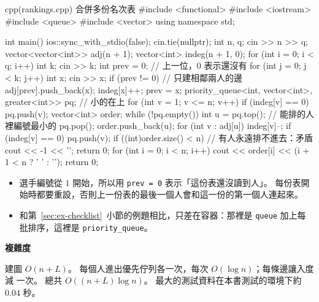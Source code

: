 \begin{example}[label=ex:rankings]{cpp}{(rankings.cpp) 合併多份名次表}
#include <functional>
#include <iostream>
#include <queue>
#include <vector>
using namespace std;

int main() {
    ios::sync_with_stdio(false);
    cin.tie(nullptr);
    int n, q;
    cin >> n >> q;
    vector<vector<int>> adj(n + 1);
    vector<int> indeg(n + 1, 0);
    for (int i = 0; i < q; i++) {
        int k;
        cin >> k;
        int prev = 0;                       // 上一位，0 表示還沒有
        for (int j = 0; j < k; j++) {
            int x;
            cin >> x;
            if (prev != 0) {                // 只建相鄰兩人的邊
                adj[prev].push_back(x);
                indeg[x]++;
            }
            prev = x;
        }
    }
    priority_queue<int, vector<int>, greater<int>> pq;   // 小的在上
    for (int v = 1; v <= n; v++) {
        if (indeg[v] == 0) {
            pq.push(v);
        }
    }
    vector<int> order;
    while (!pq.empty()) {
        int u = pq.top();                   // 能排的人裡編號最小的
        pq.pop();
        order.push_back(u);
        for (int v : adj[u]) {
            indeg[v]--;
            if (indeg[v] == 0) {
                pq.push(v);
            }
        }
    }
    if ((int)order.size() < n) {            // 有人永遠排不進去：矛盾
        cout << -1 << '\n';
        return 0;
    }
    for (int i = 0; i < n; i++) {
        cout << order[i] << (i + 1 < n ? ' ' : '\n');
    }
    return 0;
}
\end{example}


\begin{itemize}
\item 選手編號從 $1$ 開始，所以用 \texttt{prev = 0} 表示「這份表還沒讀到人」。
每份表開始時都要重設，否則上一份表的最後一個人會和這一份的第一個人連起來。
\item 和第~\ref{sec:ex-checklist}~小節的例題相比，只差在容器：那裡是
\texttt{queue} 加上每批排序，這裡是 \texttt{priority\_queue}。
\end{itemize}

\textbf{複雜度}

建圖 $O(n + L)$。 每個人進出優先佇列各一次，每次 $O(\log n)$；每條邊讓入度減
一次。 總共 $O((n + L) \log n)$。 最大的測試資料在本書測試的環境下約 $0.04$ 秒。

